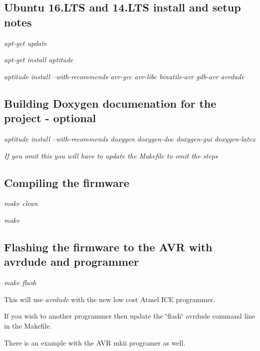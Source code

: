 \subsection*{Ubuntu 16.\+L\+TS and 14.\+L\+TS install and setup notes}


\begin{DoxyItemize}
\item {\itshape apt-\/get update}
\item {\itshape apt-\/get install aptitude}
\item {\itshape aptitude install --with-\/recommends avr-\/gcc avr-\/libc binutils-\/avr gdb-\/avr avrdude}
\end{DoxyItemize}

\subsection*{Building Doxygen documenation for the project -\/ optional}


\begin{DoxyItemize}
\item {\itshape aptitude install --with-\/recommends doxygen doxygen-\/doc doxygen-\/gui doxygen-\/latex}
\item {\itshape If you omit this you will have to update the Makefile to omit the steps}
\end{DoxyItemize}

\subsection*{Compiling the firmware}


\begin{DoxyItemize}
\item {\itshape make clean}
\item {\itshape make}
\end{DoxyItemize}

\subsection*{Flashing the firmware to the A\+VR with avrdude and programmer}


\begin{DoxyItemize}
\item {\itshape make flash}
\begin{DoxyItemize}
\item This will use {\itshape avrdude} with the new low cost Atmel I\+CE programmer.
\begin{DoxyItemize}
\item If you wish to another programmer then update the \char`\"{}flash\char`\"{} avrdude command line in the Makefile.
\item There is an example with the A\+VR mkii programer as well.
\end{DoxyItemize}
\end{DoxyItemize}
\end{DoxyItemize}

